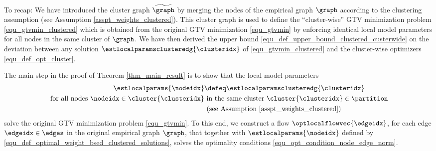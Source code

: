 \documentclass[lettersize,journal]{IEEEtran}
\begin{document}

To recap: We have introduced the cluster graph $\widetilde{\graph}$ by merging the nodes 
of the empirical graph $\graph$ according to the clustering assumption (see Assumption \ref{asspt_weights_clustered}). 
This cluster graph is used to define the ``cluster-wise'' GTV minimization problem \eqref{equ_gtvmin_clustered} 
which is obtained from the original GTV minimization \eqref{equ_gtvmin} by enforcing identical local model parameters 
for all nodes in the same cluster of $\graph$. We have then derived the upper bound \eqref{equ_def_upper_bound_clustered_custerwide} 
on the deviation between any solution $\estlocalparamsclusteredg{\clusteridx}$ of  \eqref{equ_gtvmin_clustered} 
and the cluster-wise optimizers \eqref{equ_def_opt_cluster}. 

The main step in the proof of Theorem \ref{thm_main_result} is to show that the local model parameters  
\begin{equation}
\label{equ_def_optimal_weight_bsed_clustered_solutions} 
\begin{aligned}
     \estlocalparams{\nodeidx} & \defeq  \estlocalparamsclusteredg{\clusteridx} \\
     \mbox{ for all nodes } \nodeidx \in \cluster{\clusteridx} &
\mbox{ in the same cluster } \cluster{\clusteridx} \in \partition\\
& \mbox{ (see Assumption\ \ref{asspt_weights_clustered}) } 
\end{aligned}
\vspace{-2mm}
\end{equation} 
solve the original GTV minimization problem \eqref{equ_gtvmin}. To this end, we construct a flow 
$\optlocalflowvec{\edgeidx}$, for each edge $\edgeidx \in \edges$ in the original empirical graph $\graph$, 
that together with $\estlocalparams{\nodeidx}$ defined by \eqref{equ_def_optimal_weight_bsed_clustered_solutions}, 
solves the optimality conditions \eqref{equ_opt_condition_node_edge_norm}. 
\end{document}
